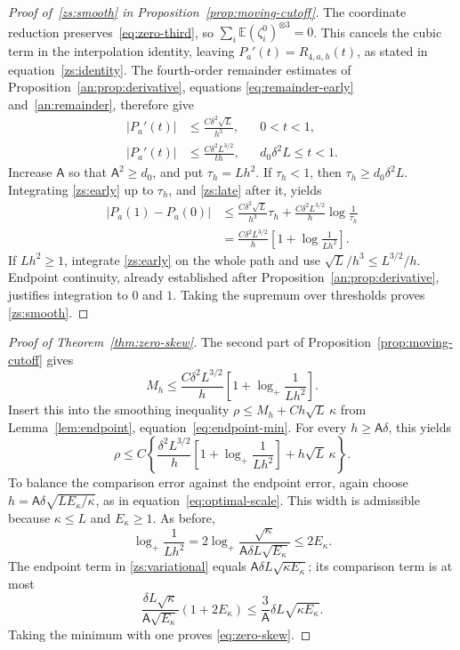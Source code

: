 \documentclass[11pt,letterpaper]{article}
\newcommand{\Ac}{\mathsf A}
\theoremstyle{remark}
\newcommand{\E}{\mathbb E}
\begin{document}
\begin{proof}[Proof of~\eqref{zs:smooth} in
Proposition~\ref{prop:moving-cutoff}]
The coordinate reduction preserves~\eqref{eq:zero-third}, so
\(\sum_i\E(\zeta_i^0)^{\otimes3}=0\). This cancels the cubic
term in the interpolation identity, leaving
\(P_a'(t)=R_{4,a,h}(t)\), as stated in equation~\eqref{zs:identity}.
The fourth-order remainder estimates of
Proposition~\ref{an:prop:derivative}, equations
\eqref{eq:remainder-early} and~\eqref{an:remainder}, therefore give
\begin{align}
 |P_a'(t)|
 &\le \frac{C\delta^2\sqrt L}{h^3},
 &&0<t<1,\label{zs:early}\\
 |P_a'(t)|
 &\le \frac{C\delta^2L^{3/2}}{t h},
 &&d_0\delta^2L\le t<1.\label{zs:late}
\end{align}
Increase \(\Ac\) so that \(\Ac^2\ge d_0\), and put \(\tau_h=Lh^2\).
If \(\tau_h<1\), then \(\tau_h\ge d_0\delta^2L\). Integrating
\eqref{zs:early} up to \(\tau_h\), and \eqref{zs:late} after it,
yields
\begin{align*}
 |P_a(1)-P_a(0)|
 &\le \frac{C\delta^2\sqrt L}{h^3}\tau_h
       +\frac{C\delta^2L^{3/2}}h\log\frac1{\tau_h}\\
 &=\frac{C\delta^2L^{3/2}}h
       \left[1+\log\frac1{Lh^2}\right].
\end{align*}
If \(Lh^2\ge1\), integrate \eqref{zs:early} on the whole path and
use \(\sqrt L/h^3\le L^{3/2}/h\). Endpoint continuity, already
established after Proposition~\ref{an:prop:derivative}, justifies
integration to \(0\) and \(1\). Taking the supremum over thresholds
proves \eqref{zs:smooth}.
\end{proof}

\begin{proof}[Proof of Theorem~\ref{thm:zero-skew}]
The second part of Proposition~\ref{prop:moving-cutoff} gives
\[
 M_h\le\frac{C\delta^2L^{3/2}}h
       \left[1+\log_+\frac1{Lh^2}\right].
\]
Insert this into the smoothing inequality
\(\rho\le M_h+Ch\sqrt L\,\kappa\) from
Lemma~\ref{lem:endpoint}, equation~\eqref{eq:endpoint-min}.
For every \(h\ge\Ac\delta\), this yields
\begin{equation}
 \rho\le C\left\{
 \frac{\delta^2L^{3/2}}h
 \left[1+\log_+\frac1{Lh^2}\right]+h\sqrt L\,\kappa\right\}.
 \label{zs:variational}
\end{equation}
To balance the comparison error against the endpoint error, again choose
\(h=\Ac\delta\sqrt{LE_\kappa/\kappa}\), as in
equation~\eqref{eq:optimal-scale}. This width is admissible because
\(\kappa\le L\) and \(E_\kappa\ge1\).
As before,
\[
 \log_+\frac1{Lh^2}
 =2\log_+\frac{\sqrt\kappa}{\Ac\delta L\sqrt{E_\kappa}}
 \le2E_\kappa.
\]
The endpoint term in \eqref{zs:variational} equals
\(\Ac\delta L\sqrt{\kappa E_\kappa}\); its comparison term is at most
\[
 \frac{\delta L\sqrt\kappa}{\Ac\sqrt{E_\kappa}}(1+2E_\kappa)
 \le\frac3{\Ac}\delta L\sqrt{\kappa E_\kappa}.
\]
Taking the minimum with one proves \eqref{eq:zero-skew}.

\end{proof}
\end{document}
